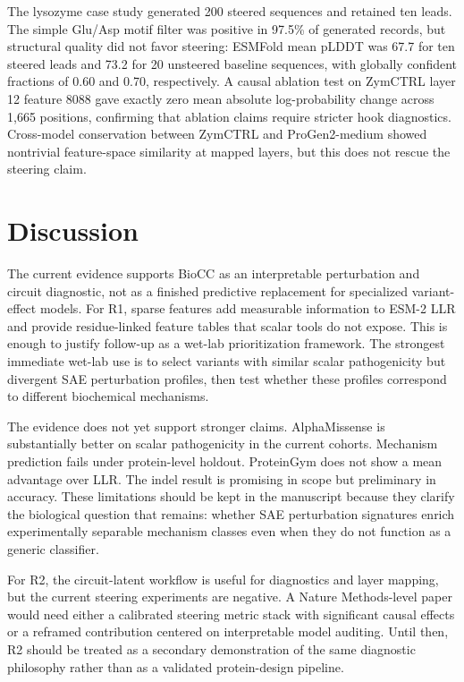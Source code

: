 \documentclass[pdflatex,sn-nature]{sn-jnl}
\begin{document}
The lysozyme case study generated 200 steered sequences and retained ten leads. The simple Glu/Asp motif filter was positive in 97.5\% of generated records, but structural quality did not favor steering: ESMFold mean pLDDT was 67.7 for ten steered leads and 73.2 for 20 unsteered baseline sequences, with globally confident fractions of 0.60 and 0.70, respectively. A causal ablation test on ZymCTRL layer 12 feature 8088 gave exactly zero mean absolute log-probability change across 1,665 positions, confirming that ablation claims require stricter hook diagnostics. Cross-model conservation between ZymCTRL and ProGen2-medium showed nontrivial feature-space similarity at mapped layers, but this does not rescue the steering claim.

\section{Discussion}\label{sec:discussion}

The current evidence supports BioCC as an interpretable perturbation and circuit diagnostic, not as a finished predictive replacement for specialized variant-effect models. For R1, sparse features add measurable information to ESM-2 LLR and provide residue-linked feature tables that scalar tools do not expose. This is enough to justify follow-up as a wet-lab prioritization framework. The strongest immediate wet-lab use is to select variants with similar scalar pathogenicity but divergent SAE perturbation profiles, then test whether these profiles correspond to different biochemical mechanisms.

The evidence does not yet support stronger claims. AlphaMissense is substantially better on scalar pathogenicity in the current cohorts. Mechanism prediction fails under protein-level holdout. ProteinGym does not show a mean advantage over LLR. The indel result is promising in scope but preliminary in accuracy. These limitations should be kept in the manuscript because they clarify the biological question that remains: whether SAE perturbation signatures enrich experimentally separable mechanism classes even when they do not function as a generic classifier.

For R2, the circuit-latent workflow is useful for diagnostics and layer mapping, but the current steering experiments are negative. A Nature Methods-level paper would need either a calibrated steering metric stack with significant causal effects or a reframed contribution centered on interpretable model auditing. Until then, R2 should be treated as a secondary demonstration of the same diagnostic philosophy rather than as a validated protein-design pipeline.
\end{document}
